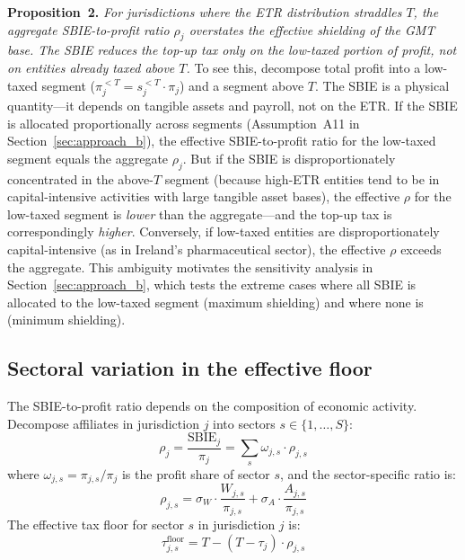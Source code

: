\documentclass[11pt,a4paper]{article}
\begin{document}
\textbf{Proposition~2.} \emph{For jurisdictions where the ETR distribution straddles $T$, the aggregate SBIE-to-profit ratio $\rho_j$ overstates the effective shielding of the GMT base. The SBIE reduces the top-up tax only on the low-taxed portion of profit, not on entities already taxed above $T$.} To see this, decompose total profit into a low-taxed segment ($\pi_j^{<T} = s_j^{<T} \cdot \pi_j$) and a segment above $T$. The SBIE is a physical quantity---it depends on tangible assets and payroll, not on the ETR. If the SBIE is allocated proportionally across segments (Assumption~A11 in Section~\ref{sec:approach_b}), the effective SBIE-to-profit ratio for the low-taxed segment equals the aggregate $\rho_j$. But if the SBIE is disproportionately concentrated in the above-$T$ segment (because high-ETR entities tend to be in capital-intensive activities with large tangible asset bases), the effective $\rho$ for the low-taxed segment is \emph{lower} than the aggregate---and the top-up tax is correspondingly \emph{higher}. Conversely, if low-taxed entities are disproportionately capital-intensive (as in Ireland's pharmaceutical sector), the effective $\rho$ exceeds the aggregate. This ambiguity motivates the sensitivity analysis in Section~\ref{sec:approach_b}, which tests the extreme cases where all SBIE is allocated to the low-taxed segment (maximum shielding) and where none is (minimum shielding).

\subsection{Sectoral variation in the effective floor}\label{sec:floor_sectoral}

The SBIE-to-profit ratio depends on the composition of economic activity. Decompose affiliates in jurisdiction $j$ into sectors $s \in \{1, \ldots, S\}$:
\begin{equation}\label{eq:rho_sectoral}
\rho_j = \frac{\text{SBIE}_j}{\pi_j} = \sum_s \omega_{j,s} \cdot \rho_{j,s}
\end{equation}
where $\omega_{j,s} = \pi_{j,s} / \pi_j$ is the profit share of sector $s$, and the sector-specific ratio is:
\begin{equation}\label{eq:rho_sector}
\rho_{j,s} = \sigma_W \cdot \frac{W_{j,s}}{\pi_{j,s}} + \sigma_A \cdot \frac{A_{j,s}}{\pi_{j,s}}
\end{equation}
The effective tax floor for sector $s$ in jurisdiction $j$ is:
\begin{equation}\label{eq:floor_sector}
\tau_{j,s}^{\text{floor}} = T - (T - \tau_j) \cdot \rho_{j,s}
\end{equation}
\end{document}
